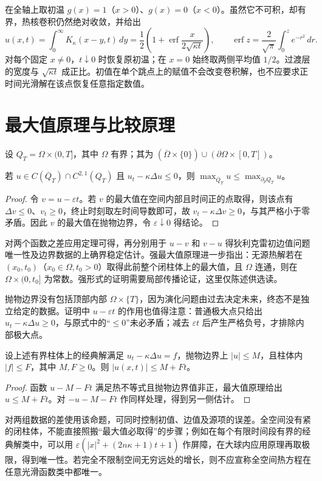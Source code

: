 \documentclass[UTF8,12pt,a4paper,fontset=fandol]{ctexbook}
\begin{document}
\begin{example}[从阶跃温度到平滑过渡层]
在全轴上取初温 $g(x)=1$（$x>0$）、$g(x)=0$（$x<0$）。虽然它不可积，却有界，热核卷积仍然绝对收敛，并给出
\[
 u(x,t)=\int_0^\infty K_\kappa(x-y,t)\,dy
 =\frac12\left(1+\operatorname{erf}\frac{x}{2\sqrt{\kappa t}}\right),
 \qquad \operatorname{erf}z=\frac2{\sqrt\pi}\int_0^z e^{-r^2}\,dr.
\]
对每个固定 $x\ne0$，$t\downarrow0$ 时恢复原初温；在 $x=0$ 始终取两侧平均值 $1/2$。过渡层的宽度与 $\sqrt{\kappa t}$ 成正比。初值在单个跳点上的赋值不会改变卷积解，也不应要求正时间光滑解在该点恢复任意指定数值。
\end{example}

\section{最大值原理与比较原理}
设 $Q_T=\Omega\times(0,T]$，其中 $\Omega$ 有界；其为 $(\overline\Omega\times\{0\})\cup(\partial\Omega\times[0,T])$。
\begin{theorem}[弱最大值原理]
若 $u\in C(\overline Q_T)\cap C^{2,1}(Q_T)$ 且 $u_t-\kappa\Delta u\le0$，则 $\max_{\overline Q_T}u\le\max_{\partial_pQ_T}u$。
\end{theorem}
\begin{proof}
令 $v=u-\varepsilon t$。若 $v$ 的最大值在空间内部且时间正的点取得，则该点有 $\Delta v\le0$、$v_t\ge0$，终止时刻取左时间导数即可，故 $v_t-\kappa\Delta v\ge0$，与其严格小于零矛盾。因此 $v$ 的最大值在抛物边界，令 $\varepsilon\downarrow0$ 得结论。
\end{proof}
对两个函数之差应用定理可得，再分别用于 $u-v$ 和 $v-u$ 得狄利克雷初边值问题唯一性及边界数据的上确界稳定估计。强最大值原理进一步指出：无源热解若在 $(x_0,t_0)$（$x_0\in\Omega,t_0>0$）取得此前整个闭柱体上的最大值，且 $\Omega$ 连通，则在 $\Omega\times(0,t_0]$ 为常数。强形式的证明需要局部传播论证，这里仅陈述供选读。

抛物边界没有包括顶部内部 $\Omega\times\{T\}$，因为演化问题由过去决定未来，终态不是独立给定的数据。证明中 $u-\varepsilon t$ 的作用也值得注意：普通极大点只给出 $u_t-\kappa\Delta u\ge0$，与原式中的“$\le0$”未必矛盾；减去 $\varepsilon t$ 后产生严格负号，才排除内部极大点。

\begin{proposition}[有源问题的振幅估计]
设上述有界柱体上的经典解满足 $u_t-\kappa\Delta u=f$，抛物边界上 $|u|\le M$，且柱体内 $|f|\le F$，其中 $M,F\ge0$。则 $|u(x,t)|\le M+Ft$。
\end{proposition}
\begin{proof}
函数 $u-M-Ft$ 满足热不等式且抛物边界值非正，最大值原理给出 $u\le M+Ft$。对 $-u-M-Ft$ 作同样处理，得到另一侧估计。
\end{proof}
对两组数据的差使用该命题，可同时控制初值、边值及源项的误差。全空间没有紧的闭柱体，不能直接照搬“最大值必取得”的步骤；例如在每个有限时间段有界的经典解类中，可以用 $\varepsilon(|x|^2+(2n\kappa+1)t+1)$ 作屏障，在大球内应用原理再取极限，得到唯一性。若完全不限制空间无穷远处的增长，则不应宣称全空间热方程在任意光滑函数类中都唯一。
\end{document}
